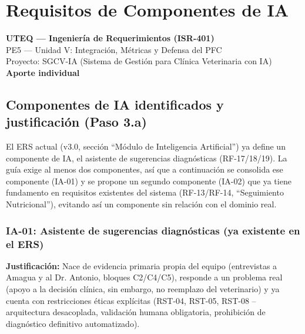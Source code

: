 
\chapter{Requisitos de Componentes de IA}
\label{cap:requisitos_ia}  

\noindent\textbf{UTEQ --- Ingeniería de Requerimientos (ISR-401)}\\
PE5 --- Unidad V: Integración, Métricas y Defensa del PFC\\
Proyecto: SGCV-IA (Sistema de Gestión para Clínica Veterinaria con IA)\\
\textbf{Aporte individual}

\section{Componentes de IA identificados y justificación (Paso 3.a)}
\label{sec:ia-justificacion}

El ERS actual (v3.0, sección ``Módulo de Inteligencia Artificial'') ya define un componente de IA, el asistente de sugerencias diagnósticas (RF-17/18/19). La guía exige al menos dos componentes, así que a continuación se consolida ese componente (IA-01) y se propone un segundo componente (IA-02) que ya tiene fundamento en requisitos existentes del sistema (RF-13/RF-14, ``Seguimiento Nutricional''), evitando así un componente sin relación con el dominio real.

\subsection*{IA-01: Asistente de sugerencias diagnósticas (ya existente en el ERS)}

\textbf{Justificación:} Nace de evidencia primaria propia del equipo (entrevistas a Amagua y al Dr. Antonio, bloques C2/C4/C5), responde a un problema real (apoyo a la decisión clínica, sin embargo, no reemplazo del veterinario) y ya cuenta con restricciones éticas explícitas (RST-04, RST-05, RST-08 -- arquitectura desacoplada, validación humana obligatoria, prohibición de diagnóstico definitivo automatizado).

